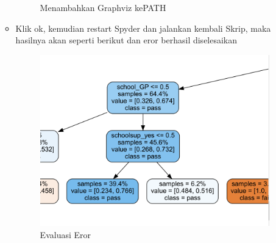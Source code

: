 \begin{enumerate}
\begin{itemize}
\begin{figure}[ht]
\caption{Menambahkan Graphviz kePATH}
\label{Eror}
\end{figure}
\item
Klik ok, kemudian restart Spyder dan jalankan kembali Skrip, maka hasilnya akan seperti berikut dan eror berhasil diselesaikan
\begin{figure}[ht]
\centering
\includegraphics[scale=0.5]{figures/solusi5.png}
\caption{Evaluasi Eror}
\label{Eror}
\end{figure}
\end{itemize}
\end{enumerate}

